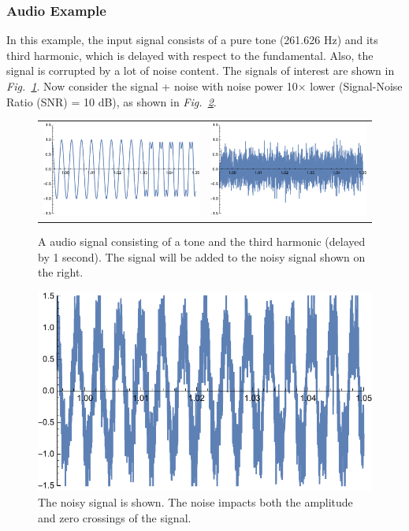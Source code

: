 \subsubsection{Audio Example}
In this example, the input signal consists of a pure tone (261.626 Hz) and its third harmonic, which is delayed with respect to the fundamental.  Also, the signal is corrupted by a lot of noise content.  The signals of interest are shown in \emph{Fig.~\ref{fig:tones_time}}.  Now consider the signal + noise with noise power 10$\times$ lower (Signal-Noise Ratio (SNR) = 10 dB), as shown in \emph{Fig.~\ref{fig:sigplusnoise}}.
\begin{figure}[H]
\centering
\begin{tabular}{cc}
\includegraphics[width=.45\columnwidth]{tonesintime.pdf} &
\includegraphics[width=.45\columnwidth]{noiseonly.pdf} \\
\end{tabular}
\caption{A audio signal consisting of a tone and the third harmonic (delayed by 1 second).  The signal will be added to the noisy signal shown on the right.}
\label{fig:tones_time}
\end{figure}
\begin{figure}[H]
\begin{center}
\includegraphics[width=.45\columnwidth]{signoise.pdf}
\end{center}
\caption{The noisy signal is shown.  The noise impacts both the amplitude and zero crossings of the signal.} \label{fig:sigplusnoise}
\end{figure}
